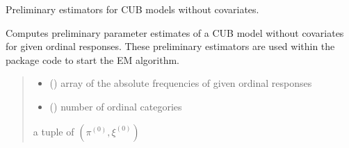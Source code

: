 \documentclass[letterpaper,10pt,english]{sphinxmanual}
\begin{document}
\begin{fulllineitems}
\label{\detokenize{cubmods:cubmods.cub.init_theta}}
\pysigstartsignatures
{}
\pysigstopsignatures
\sphinxAtStartPar
Preliminary estimators for CUB models without covariates.

\sphinxAtStartPar
Computes preliminary parameter estimates of a CUB model without covariates for given ordinal
responses. These preliminary estimators are used within the package code to start the E\sphinxhyphen{}M algorithm.
\begin{quote}\begin{description}
\begin{itemize}
\item {} 
\sphinxAtStartPar
{} () \textendash{} array of the absolute frequencies of given ordinal responses

\item {} 
\sphinxAtStartPar
{} () \textendash{} number of ordinal categories

\end{itemize}

\sphinxAtStartPar
a tuple of \((\pi^{(0)}, \xi^{(0)})\)

\end{description}\end{quote}

\end{fulllineitems}

\end{document}
